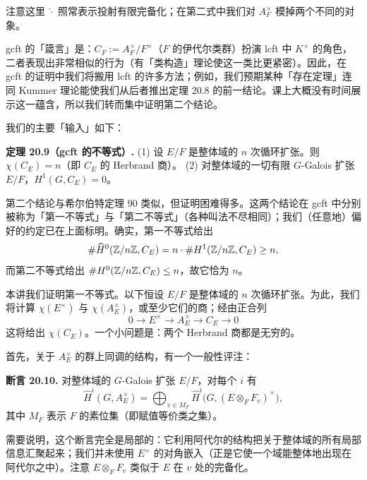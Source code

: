 注意这里 $\widehat{\cdot}$ 照常表示投射有限完备化；在第二式中我们对 $A_F^\times$ 模掉两个不同的对象。

gcft 的「箴言」是：$C_F:=A_F^\times/F^\times$（$F$ 的伊代尔类群）扮演 lcft 中 $K^\times$ 的角色，二者表现出非常相似的行为（有「类构造」理论使这一类比更紧密）。因此，在 gcft 的证明中我们将搬用 lcft 的许多方法；例如，我们预期某种「存在定理」连同 Kummer 理论能使我们从后者推出定理 20.8 的前一结论。课上大概没有时间展示这一蕴含，所以我们转而集中证明第二个结论。

我们的主要「输入」如下：

\textbf{定理 20.9（gcft 的不等式）.} (1) 设 $E/F$ 是整体域的 $n$ 次循环扩张。则 $\chi(C_E)=n$（即 $C_E$ 的 Herbrand 商）。
(2) 对整体域的一切有限 $G$-Galois 扩张 $E/F$，$H^1(G,C_E)=0$。

第二个结论与希尔伯特定理 90 类似，但证明困难得多。这两个结论在 gcft 中分别被称为「第一不等式」与「第二不等式」（各种叫法不尽相同）；我们（任意地）偏好的约定已在上面标明。确实，第一不等式给出
\[
\#\widehat H^0(\mathbb{Z}/n\mathbb{Z},C_E)=n\cdot\#H^1(\mathbb{Z}/n\mathbb{Z},C_E)\geq n,
\]
而第二不等式给出 $\#H^0(\mathbb{Z}/n\mathbb{Z},C_E)\leq n$，故它恰为 $n$。

本讲我们证明第一不等式。以下恒设 $E/F$ 是整体域的 $n$ 次循环扩张。为此，我们将计算 $\chi(E^\times)$ 与 $\chi(A_E^\times)$，或至少它们的商；经由正合列
\[
0\to E^\times\to A_E^\times\to C_E\to 0
\]
这将给出 $\chi(C_E)$。一个小问题是：两个 Herbrand 商都是无穷的。

首先，关于 $A_E^\times$ 的群上同调的结构，有一个一般性评注：

\textbf{断言 20.10.} 对整体域的 $G$-Galois 扩张 $E/F$，对每个 $i$ 有
\[
\widehat H^i(G,A_E^\times)=\bigoplus_{v\in M_F}\widehat H^i\bigl(G,(E\otimes_F F_v)^\times\bigr),
\]
其中 $M_F$ 表示 $F$ 的素位集（即赋值等价类之集）。

需要说明，这个断言完全是局部的：它利用阿代尔的结构把关于整体域的所有局部信息汇聚起来；我们并未使用 $E^\times$ 的对角嵌入（正是它使一个域能整体地出现在阿代尔之中）。注意 $E\otimes_F F_v$ 类似于 $E$ 在 $v$ 处的完备化。

